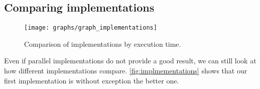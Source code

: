 \subsection{Comparing implementations}

\begin{figure}
  \texttt{[image: graphs/graph\_implementations]}
  \caption{Comparison of implementations by execution time.}
  \label{fig:implmementations}
\end{figure}

Even if parallel implementations do not provide a good result, we can still look at how different implementations compare. \autoref{fig:implmementations} shows that our first implementation is without exception the better one.
